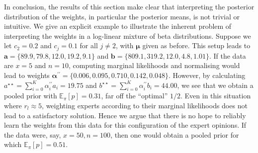 \documentclass[a4paper, notitlepage, 10pt]{article}
\begin{document}
In conclusion, the results of this section make clear that interpreting the posterior distribution of the weights, in particular the posterior means, is not trivial or intuitive.
We give an explicit example to illustrate the inherent problem of interpreting the weights in a log-linear mixture of beta distributions.
Suppose we let $c_2 = 0.2$ and $c_j = 0.1$ for all $j \neq 2$, with $\boldsymbol \mu$ given as before.
This setup leads to $\boldsymbol a = \{ 89.9, 79.8, 12.0, 19.2, 9.1\}$ and $\boldsymbol b = \{809.1, 319.2, 12.0, 4.8, 1.01\} $.
If the data are $x = 5$ and $n = 10$, computing marginal likelihoods and normalising would lead to weights $\boldsymbol\alpha^{\prime\prime} = \{0.006, 0.095, 0.710, 0.142, 0.048\}$.
However, by calculating $a^{\star\star} = \sum_{i = 0}^K \alpha_i^{\prime\prime} a_i = 19.75$ and $b^{\star\star} =  \sum_{i = 0}^K \alpha_i^{\prime\prime} b_i = 44.00$, we see that we obtain a pooled prior with $\mathbb{E}_\pi [p] =  0.31$, far off the ``optimal'' $1/2$.
Even in this situation where $r_l \approx 5$, weighting experts according to their marginal likelihoods does not lead to a satisfactory solution.
Hence we argue that there is no hope to reliably learn the weights from this data for this configuration of the expert opinions.
If the data were, say, $x = 50, n = 100$, then one would obtain a pooled prior for which $\mathbb{E}_\pi [p] = 0.51$.
\end{document}
